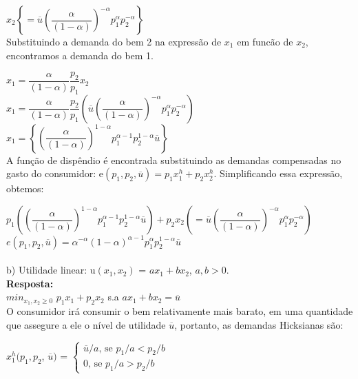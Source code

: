 \begin{enumerate}
{$x_{2}\left\lbrace = \overline{u} \left(\dfrac{\alpha}{(1 - \alpha)}\right)^{-\alpha}p_{1}^{\alpha}p_{2}^{-\alpha}\right\rbrace$}\\

Substituindo a demanda do bem 2 na expressão de {$x_{1}$} em funcão de {$x_{2}$}, encontramos
a demanda do bem 1. 

{$x_{1} = \dfrac{\alpha}{(1 - \alpha)}\dfrac{p_2}{p_1} x_{2}$}\\


{$x_{1} = \dfrac{\alpha}{(1 - \alpha)}\dfrac{p_2}{p_1}\left(\overline{u} \left(\dfrac{\alpha}{(1 - \alpha)}\right)^{-\alpha}p_{1}^{\alpha}p_{2}^{-\alpha}\right)$}\\

{$x_{1} = \left\lbrace\left(\dfrac{\alpha}{(1 - \alpha)}\right)^{1 - \alpha}p_{1}^{\alpha - 1}p_{2}^{1 - \alpha}\overline{u}\right\rbrace$}\\

A função de dispêndio é encontrada substituindo as demandas compensadas no gasto do consumidor: e{$(p_1, p_2, \overline{u}) = p_{1}x_{1}^{h} +  p_{2}x_{2}^{h}$}. Simplificando essa expressão, obtemos:

{$p_{1}\left(\left(\dfrac{\alpha}{(1 - \alpha)}\right)^{1 - \alpha}p_{1}^{\alpha - 1}p_{2}^{1 - \alpha}\overline{u}\right) + p_{2}x_{2}\left(= \overline{u} \left(\dfrac{\alpha}{(1 - \alpha)}\right)^{-\alpha}p_{1}^{\alpha}p_{2}^{-\alpha}\right)$}\\

{$e(p_{1}, p_{2},\overline{u}) = \alpha^{-\alpha}(1 - \alpha)^{\alpha - 1}p_{1}^{\alpha}p_{2}^{1 - \alpha} \overline{u}$}\\


\paragraph{}b) Utilidade linear: u{$(x_1, x_2)$} = {$ax_{1}+bx_{2}$}, {$a,b>0$}.\\

\textbf{Resposta:}\\

{$min_{x_{1}, x_{2} \geq 0}$} {$p_{1}x_{1} + p_{2}x_{2}$} s.a {$ax_{1}+bx_{2} = \overline{u}$}\\

O consumidor irá consumir o bem relativamente mais barato, em uma quantidade que assegure a ele o nível de utilidade {$\overline{u}$}, portanto, as demandas Hicksianas são:

{$x_{1}^{h}(p_{1},p_{2}$}, {$\overline{u})$} = 
{$\begin{cases} \overline{u}/a\textrm{, se } p_1/a < p_2/b\\
0\textrm{, se } p_1/a > p_2/b
\end{cases}$} 


\end{enumerate}
